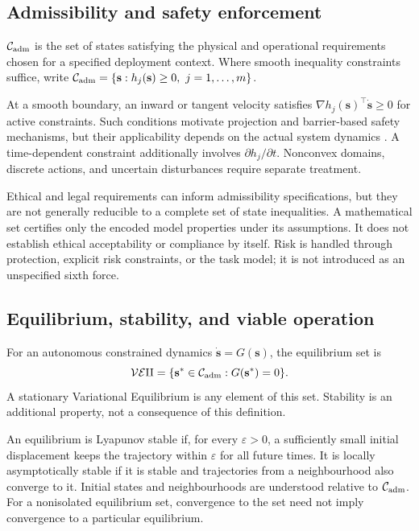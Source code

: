 \subsection{Admissibility and safety enforcement}
\label{subsec:admissibility}
\begin{definition}
$\mathcal{C}_{\mathrm{adm}}$ is the set of states satisfying the physical and operational requirements chosen for a specified deployment context. Where smooth inequality constraints suffice, write $\Adm=\{\mathbf{s}:h_j(\mathbf{s})\geq0,\ j=1,\ldots,m\}$.
\end{definition}

At a smooth boundary, an inward or tangent velocity satisfies $\nabla h_j(\mathbf{s})^\top\dot{\mathbf{s}}\geq0$ for active constraints. Such conditions motivate projection and barrier-based safety mechanisms, but their applicability depends on the actual system dynamics \citep{ames2019barrier}. A time-dependent constraint additionally involves $\partial h_j/\partial t$. Nonconvex domains, discrete actions, and uncertain disturbances require separate treatment.

Ethical and legal requirements can inform admissibility specifications, but they are not generally reducible to a complete set of state inequalities. A mathematical set certifies only the encoded model properties under its assumptions. It does not establish ethical acceptability or compliance by itself. Risk is handled through protection, explicit risk constraints, or the task model; it is not introduced as an unspecified sixth force.

\subsection{Equilibrium, stability, and viable operation}
\begin{definition}
For an autonomous constrained dynamics $\dot{\mathbf{s}}=G(\mathbf{s})$, the equilibrium set is
\begin{equation}
 \mathcal{VEq}=\{\mathbf{s}^*\in\mathcal{C}_{\mathrm{adm}}:G(\mathbf{s}^*)=0\}.
 \label{eq:veq}
\end{equation}
A stationary Variational Equilibrium is any element of this set. Stability is an additional property, not a consequence of this definition.
\end{definition}

An equilibrium is Lyapunov stable if, for every $\varepsilon>0$, a sufficiently small initial displacement keeps the trajectory within $\varepsilon$ for all future times. It is locally asymptotically stable if it is stable and trajectories from a neighbourhood also converge to it. Initial states and neighbourhoods are understood relative to $\mathcal{C}_{\mathrm{adm}}$. For a nonisolated equilibrium set, convergence to the set need not imply convergence to a particular equilibrium.

